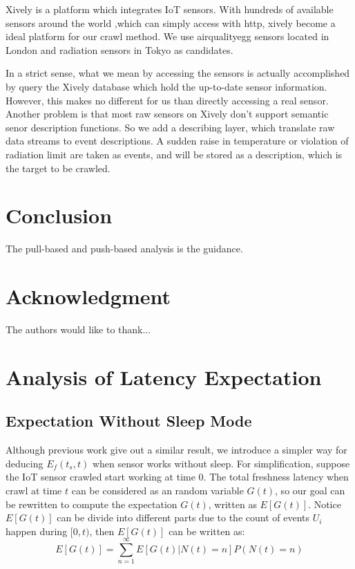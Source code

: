 \documentclass[conference]{IEEEtran}
\begin{document}
Xively is a platform which integrates IoT sensors. With hundreds of available sensors around the world ,which can simply access with http, xively become a ideal platform for our crawl method. 
We use airqualityegg\cite{airegg} sensors located in London and radiation sensors in Tokyo as candidates. 


In a strict sense, what we mean by accessing the sensors is actually accomplished by query the Xively database which hold the up-to-date sensor information. However, this makes no different for us than directly accessing a real sensor. Another problem is that most raw sensors on Xively don't support semantic senor description functions. So we add a describing layer, which translate raw data streams to event descriptions. A sudden raise in temperature or violation of radiation limit are taken as events, and will be stored as a description, which is the target to be crawled.



\section{Conclusion}

The pull-based and push-based analysis is the guidance.

\section*{Acknowledgment}


The authors would like to thank...


\ifCLASSOPTIONcaptionsoff
  \newpage
\fi





%
%
%
%

\appendices
\section{Analysis of Latency Expectation}

\subsection{Expectation Without Sleep Mode}
Although previous work\cite{Cho2000} give out a similar result, we introduce a simpler way for deducing $E_f(t_s, t)$ when sensor works without sleep. For simplification, suppose the IoT sensor crawled start working at time $0$. The total freshness latency when crawl at time $t$ can be considered as an random variable $G(t)$, so our goal can be rewritten to compute the expectation $G(t)$, written as $E[G(t)]$. 
Notice $E[G(t)]$ can be divide into different parts due to the count of events $U_i$ happen during $[0, t)$, then $E[G(t)]$ can be written as:
\begin{equation}
E[G(t)] = \sum_{n=1}^{\infty} E[G(t)|N(t)=n]P(N(t)=n) \label{EG}
\end{equation}
\end{document}
